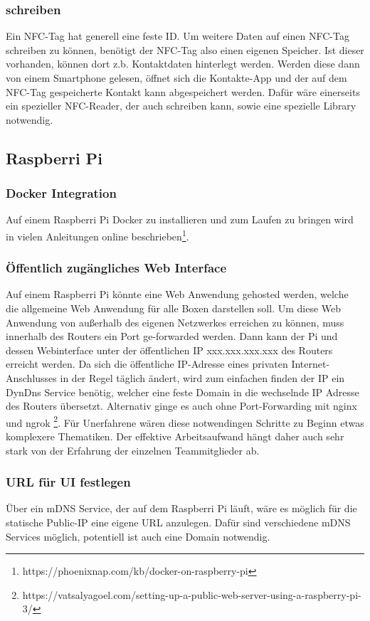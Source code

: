 \documentclass[10pt, a4paper, draft]{article}
\begin{document}
\subsubsection{schreiben}
Ein NFC-Tag hat generell eine feste ID.
Um weitere Daten auf einen NFC-Tag schreiben zu können, benötigt der NFC-Tag also einen eigenen Speicher.
Ist dieser vorhanden, können dort z.b. Kontaktdaten hinterlegt werden. Werden diese dann von einem Smartphone gelesen, öffnet sich die Kontakte-App und der auf dem NFC-Tag gespeicherte Kontakt kann abgespeichert werden.
Dafür wäre einerseits ein spezieller NFC-Reader, der auch schreiben kann, sowie eine spezielle Library notwendig.

\subsection{Raspberri Pi}
\subsubsection{Docker Integration}
Auf einem Raspberri Pi Docker zu installieren und zum Laufen zu bringen wird in vielen Anleitungen online beschrieben\footnote{https://phoenixnap.com/kb/docker-on-raspberry-pi}.

\subsubsection{Öffentlich zugängliches Web Interface}
Auf einem Raspberri Pi könnte eine Web Anwendung gehosted werden, welche die allgemeine Web Anwendung für alle Boxen darstellen soll.
Um diese Web Anwendung von außerhalb des eigenen Netzwerkes erreichen zu können, muss innerhalb des Routers ein Port ge-forwarded werden.
Dann kann der Pi und dessen Webinterface unter der öffentlichen IP xxx.xxx.xxx.xxx des Routers erreicht werden.
Da sich die öffentliche IP-Adresse eines privaten Internet-Anschlusses in der Regel täglich ändert, wird zum einfachen finden der IP ein DynDns Service benötig, welcher eine feste Domain in die wechselnde IP Adresse des Routers übersetzt.
Alternativ ginge es auch ohne Port-Forwarding mit nginx und ngrok \footnote{https://vatsalyagoel.com/setting-up-a-public-web-server-using-a-raspberry-pi-3/}.
Für Unerfahrene wären diese notwendingen Schritte zu Beginn etwas komplexere Thematiken. Der effektive Arbeitsaufwand hängt daher auch sehr stark von der Erfahrung der einzelnen Teammitglieder ab.

\subsubsection{URL für UI festlegen}
Über ein mDNS Service, der auf dem Raspberri Pi läuft, wäre es möglich für die statische Public-IP eine eigene URL anzulegen.
Dafür sind verschiedene mDNS Services möglich, potentiell ist auch eine Domain notwendig.
\end{document}

